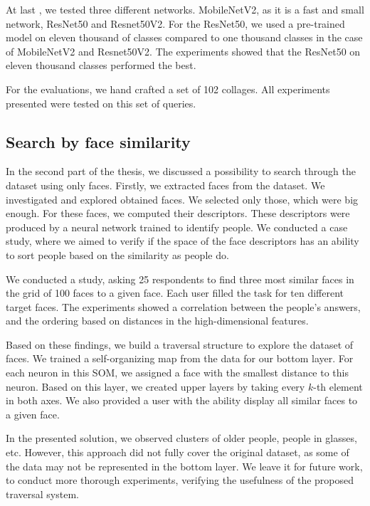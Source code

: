 At last , we tested three different networks. MobileNetV2, as it is a fast and small network, ResNet50 and Resnet50V2. For the ResNet50, we used a pre-trained model on eleven thousand of classes compared to one thousand classes in the case of MobileNetV2 and Resnet50V2. The experiments showed that the ResNet50 on eleven thousand classes performed the best.

For the evaluations, we hand crafted a set of 102 collages. All experiments presented were tested on this set of queries.

\subsection*{Search by face similarity}

In the second part of the thesis, we discussed a possibility to search through the dataset using only faces. Firstly, we extracted faces from the dataset. We investigated and explored obtained faces. We selected only those, which were big enough. For these faces, we computed their descriptors. These descriptors were produced by a neural network trained to identify people. We conducted a case study, where we aimed to verify if the space of the face descriptors has an ability to sort people based on the similarity as people do.

We conducted a study, asking 25 respondents to find three most similar faces in the grid of 100 faces to a given face. Each user filled the task for ten different target faces. The experiments showed a correlation between the people's answers, and the ordering based on distances in the high-dimensional features.

Based on these findings, we build a traversal structure to explore the dataset of faces. We trained a self-organizing map from the data for our bottom layer. For each neuron in this SOM, we assigned a face with the smallest distance to this neuron. Based on this layer, we created upper layers by taking every $k$-th element in both axes. We also provided a user with the ability display all similar faces  to a given face.

In the presented solution, we observed clusters of older people, people in glasses, etc. However, this approach did not fully cover the original dataset, as some of the data may not be represented in the bottom layer. We leave it for future work, to conduct more thorough experiments, verifying the usefulness of the proposed traversal system.

